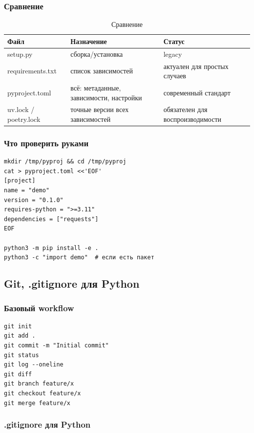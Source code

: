 \subsubsection{Сравнение}
\begin{table}[h]
\centering
\begin{tabular}{|l|l|l|}
\hline
\textbf{Файл} & \textbf{Назначение} & \textbf{Статус} \\
\hline
setup.py & сборка/установка & legacy \\
requirements.txt & список зависимостей & актуален для простых случаев \\
pyproject.toml & всё: метаданные, зависимости, настройки & современный стандарт \\
uv.lock / poetry.lock & точные версии всех зависимостей & обязателен для воспроизводимости \\
\hline
\end{tabular}
\caption{Сравнение}
\label{tab:differents}
\end{table}
\subsubsection{Что проверить руками}
\begin{lstlisting}
mkdir /tmp/pyproj && cd /tmp/pyproj
cat > pyproject.toml <<'EOF'
[project]
name = "demo"
version = "0.1.0"
requires-python = ">=3.11"
dependencies = ["requests"]
EOF

python3 -m pip install -e .
python3 -c "import demo"  # если есть пакет
\end{lstlisting}
\newpage
\subsection{ Git, .gitignore для Python}
\subsubsection{ Базовый workflow}
\begin{lstlisting}
git init
git add .
git commit -m "Initial commit"
git status
git log --oneline
git diff
git branch feature/x
git checkout feature/x
git merge feature/x
\end{lstlisting}

\subsubsection{.gitignore для Python}

